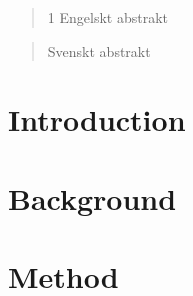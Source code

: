 \documentclass[a4paper, 12pt]{article}
\begin{document}
\begin{abstract}1
    Engelskt abstrakt
\end{abstract}

\bigskip

\bigskip

\bigskip

\bigskip

\begin{otherlanguage}{swedish}
\begin{abstract}
    Svenskt abstrakt
  
\end{abstract}
\end{otherlanguage}


\newpage
\tableofcontents
\newpage
{}

\section{Introduction}
%

\section{Background}
%


\section{Method}





\newpage
%

\newpage




\appendix
\end{document}

